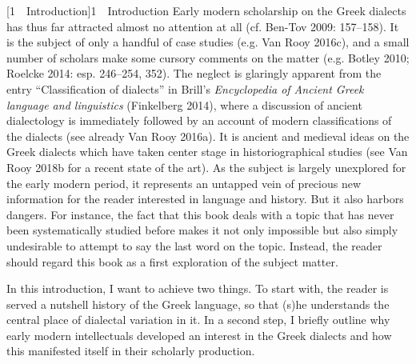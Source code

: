 \documentclass[12pt]{article}
\makeatletter
\renewcommand\section{\@startsection{section}{1}{0.0in}{0.1665in}{0.0835in}{\normalfont\normalsize\fontsize{14pt}{16.8pt}\selectfont\rmfamily\bfseries}}
\newenvironment{styleStandard}{\renewcommand\baselinestretch{1.25}\setlength\leftskip{0in}\setlength\rightskip{0in}\setlength\parindent{0.1972in}\setlength\parfillskip{0pt plus 1fil}\setlength\parskip{0in plus 1pt}\writerlistparindent\writerlistleftskip\leavevmode\normalfont\normalsize\writerlistlabel\ignorespaces}{\unskip\vspace{0in plus 1pt}\par}
\newcommand\writerlistleftskip{}
\newcommand\writerlistparindent{}
\newcommand\writerlistlabel{}
\makeatother
\begin{document}
\clearpage\section[1\ \ Introduction]{1\ \ Introduction}
\hypertarget{Toc19704802}{}\begin{styleStandard}
Early modern scholarship on the Greek dialects has thus far attracted almost no attention at all (cf. Ben-Tov 2009: 157–158). It is the subject of only a handful of case studies (e.g. Van Rooy 2016c), and a small number of scholars make some cursory comments on the matter (e.g. Botley 2010; Roelcke 2014: esp. 246–254, 352). The neglect is glaringly apparent from the entry “Classification of dialects” in Brill’s \textit{Encyclopedia of Ancient Greek language and linguistics} (Finkelberg 2014), where a discussion of ancient dialectology is immediately followed by an account of modern classifications of the dialects (see already Van Rooy 2016a). It is ancient and medieval ideas on the Greek dialects which have taken center stage in historiographical studies (see Van Rooy 2018b for a recent state of the art). As the subject is largely unexplored for the early modern period, it represents an untapped vein of precious new information for the reader interested in language and history. But it also harbors dangers. For instance, the fact that this book deals with a topic that has never been systematically studied before makes it not only impossible but also simply undesirable to attempt to say the last word on the topic. Instead, the reader should regard this book as a first exploration of the subject matter.
\end{styleStandard}

\begin{styleStandard}
In this introduction, I want to achieve two things. To start with, the reader is served a nutshell history of the Greek language, so that (s)he understands the central place of dialectal variation in it. In a second step, I briefly outline why early modern intellectuals developed an interest in the Greek dialects and how this manifested itself in their scholarly production.
\end{styleStandard}
\end{document}

